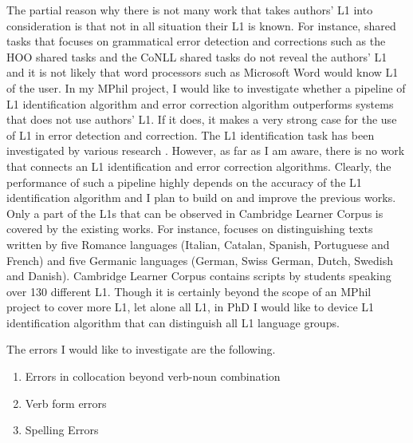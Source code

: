 \documentclass[11pt]{article}
\begin{document}
The partial reason why there is not many work that takes authors' L1 into consideration is that not in all situation their L1 is known. For instance, shared tasks that focuses on grammatical error detection and corrections such as the HOO shared tasks and the CoNLL shared tasks do not reveal the authors' L1 and it is not likely that word processors such as Microsoft Word would know L1 of the user. In my MPhil project, I would like to investigate whether a pipeline of L1 identification algorithm and error correction algorithm outperforms systems that does not use authors' L1. If it does, it makes a very strong case for the use of L1 in error detection and correction. The L1 identification task has been investigated by various research \citep{estival2007author, tomokiyo2001you, koppel2005determining, koppel2005automatically, wong2009contrastive, kochmar2011identification}. However, as far as I am aware, there is no work that connects an L1 identification and error correction algorithms. Clearly, the performance of such a pipeline highly depends on the accuracy of the L1 identification algorithm and I plan to build on and improve the previous works. Only a part of the L1s that can be observed in Cambridge Learner Corpus is covered by the existing works. For instance, \cite{kochmar2011identification} focuses on distinguishing texts written by five Romance languages (Italian, Catalan, Spanish, Portuguese and French) and five Germanic languages (German, Swiss German, Dutch, Swedish and Danish). Cambridge Learner Corpus contains scripts by students speaking over 130 different L1. Though it is certainly beyond the scope of an MPhil project to cover more L1, let alone all L1, in PhD I would like to device L1 identification algorithm that can distinguish all L1 language groups.

The errors I would like to investigate are the following.
\begin{enumerate}
\item Errors in collocation beyond verb-noun combination \label{error:1}
\item Verb form errors \label{error:2}
\item Spelling Errors \label{error:3}
\end{enumerate}
\end{document}
